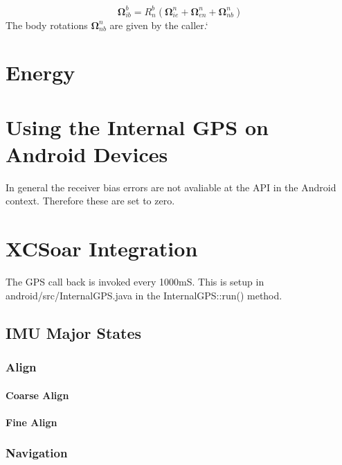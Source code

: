 \documentclass[a4paper]{report}
\numberwithin{equation}{chapter}
\newcommand{\mat}[1]{\boldsymbol{#1}}
\begin{document}
\begin{equation}
\mat{\Omega}^b_{ib} = R^b_n \left( \mat{\Omega}^n_{ie} + \mat{\Omega}^n_{en} + \mat{\Omega}^n_{nb} \right)
\end{equation}
The body rotations $\mat{\Omega}^n_{nb}$ are given by the caller.`

\clearpage\setcounter{page}{1}
\chapter[Energy]{Energy}

\clearpage\setcounter{page}{1}
\chapter[Using the Internal GPS on Android Devices]{Using the Internal GPS on Android Devices}

In general the receiver bias errors are not avaliable at the API in the Android context. Therefore these are set to zero.

\clearpage\setcounter{page}{1}
\chapter[XCSoar Integration]{XCSoar Integration}

The GPS call back is invoked every 1000mS. This is setup in android/src/InternalGPS.java in the InternalGPS::run() method.

\section[IMU Major States]{IMU Major States}

\subsection[Align]{Align}

\subsubsection[Coarse Align]{Coarse Align}

\subsubsection[Fine Align]{Fine Align}

\subsection[Navigate]{Navigation}
\end{document}
